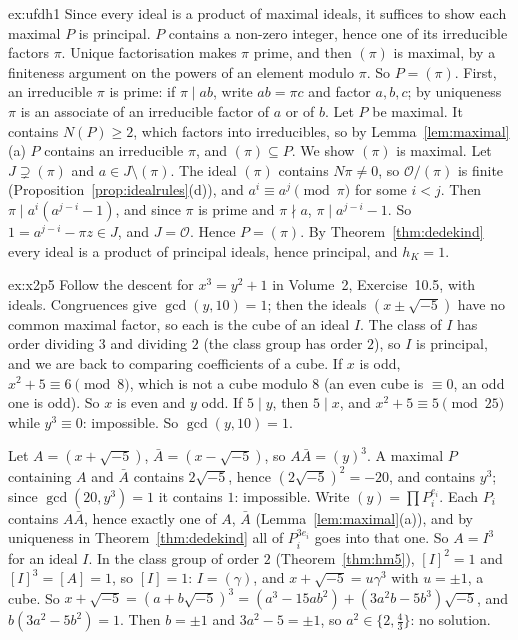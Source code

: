 \begin{solution}{ex:ufdh1}
\idea Since every ideal is a product of maximal ideals, it suffices to show each maximal $P$ is principal. $P$ contains a non-zero integer, hence one of its irreducible factors $\pi$. Unique factorisation makes $\pi$ prime, and then $(\pi)$ is maximal, by a finiteness argument on the powers of an element modulo $\pi$. So $P=(\pi)$.
\writeup First, an irreducible $\pi$ is prime: if $\pi\mid ab$, write $ab=\pi c$ and factor $a,b,c$; by uniqueness $\pi$ is an associate of an irreducible factor of $a$ or of $b$. Let $P$ be maximal. It contains $N(P)\ge2$, which factors into irreducibles, so by Lemma~\ref{lem:maximal}(a) $P$ contains an irreducible $\pi$, and $(\pi)\subseteq P$. We show $(\pi)$ is maximal. Let $J\supsetneq(\pi)$ and $a\in J\setminus(\pi)$. The ideal $(\pi)$ contains $N\pi\ne0$, so $\mathcal O/(\pi)$ is finite (Proposition~\ref{prop:idealrules}(d)), and $a^i\equiv a^j\pmod\pi$ for some $i<j$. Then $\pi\mid a^i(a^{j-i}-1)$, and since $\pi$ is prime and $\pi\nmid a$, $\pi\mid a^{j-i}-1$. So $1=a^{j-i}-\pi z\in J$, and $J=\mathcal O$. Hence $P=(\pi)$. By Theorem~\ref{thm:dedekind} every ideal is a product of principal ideals, hence principal, and $h_K=1$.
\end{solution}

\begin{solution}{ex:x2p5}
\idea Follow the descent for $x^3=y^2+1$ in Volume~2, Exercise~10.5, with ideals. Congruences give $\gcd(y,10)=1$; then the ideals $(x\pm\sqrt{-5})$ have no common maximal factor, so each is the cube of an ideal $I$. The class of $I$ has order dividing $3$ and dividing $2$ (the class group has order $2$), so $I$ is principal, and we are back to comparing coefficients of a cube.
\writeup If $x$ is odd, $x^2+5\equiv6\pmod8$, which is not a cube modulo $8$ (an even cube is $\equiv0$, an odd one is odd). So $x$ is even and $y$ odd. If $5\mid y$, then $5\mid x$, and $x^2+5\equiv5\pmod{25}$ while $y^3\equiv0$: impossible. So $\gcd(y,10)=1$.

Let $A=(x+\sqrt{-5})$, $\bar A=(x-\sqrt{-5})$, so $A\bar A=(y)^3$. A maximal $P$ containing $A$ and $\bar A$ contains $2\sqrt{-5}$, hence $(2\sqrt{-5})^2=-20$, and contains $y^3$; since $\gcd(20,y^3)=1$ it contains $1$: impossible. Write $(y)=\prod P_i^{e_i}$. Each $P_i$ contains $A\bar A$, hence exactly one of $A$, $\bar A$ (Lemma~\ref{lem:maximal}(a)), and by uniqueness in Theorem~\ref{thm:dedekind} all of $P_i^{3e_i}$ goes into that one. So $A=I^3$ for an ideal $I$. In the class group of order $2$ (Theorem~\ref{thm:hm5}), $[I]^2=1$ and $[I]^3=[A]=1$, so $[I]=1$: $I=(\gamma)$, and $x+\sqrt{-5}=u\gamma^3$ with $u=\pm1$, a cube. So $x+\sqrt{-5}=(a+b\sqrt{-5})^3=(a^3-15ab^2)+(3a^2b-5b^3)\sqrt{-5}$, and $b(3a^2-5b^2)=1$. Then $b=\pm1$ and $3a^2-5=\pm1$, so $a^2\in\{2,\frac43\}$: no solution.
\end{solution}

